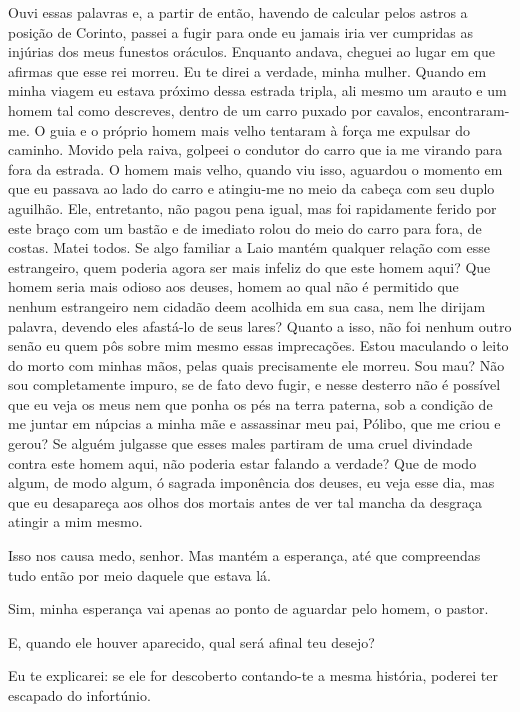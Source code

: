 Ouvi essas palavras e, a partir de então, havendo de calcular pelos
astros a posição de Corinto, passei a fugir para onde eu jamais iria ver
cumpridas as injúrias dos meus funestos oráculos. Enquanto andava,
cheguei ao lugar em que afirmas que esse rei morreu. Eu te direi a
verdade, minha mulher. Quando em minha viagem eu estava próximo dessa
estrada tripla, ali mesmo um arauto e um homem tal como descreves,
dentro de um carro puxado por cavalos, encontraram-me. O guia e o
próprio homem mais velho tentaram à força me expulsar do caminho. Movido
pela raiva, golpeei o condutor do carro que ia me virando para fora da
estrada. O homem mais velho, quando viu isso, aguardou o momento em que
eu passava ao lado do carro e atingiu-me no meio da cabeça com seu
duplo aguilhão. Ele, entretanto, não pagou pena igual, mas foi
rapidamente ferido por este braço com um bastão e de imediato rolou do
meio do carro para fora, de costas. Matei todos. Se algo familiar a Laio
mantém qualquer relação com esse estrangeiro, quem poderia agora ser
mais infeliz do que este homem aqui? Que homem seria mais odioso aos
deuses, homem ao qual não é permitido que nenhum estrangeiro nem cidadão
deem acolhida em sua casa, nem lhe dirijam palavra, devendo eles
afastá-lo de seus lares? Quanto a isso, não foi nenhum outro senão eu
quem pôs sobre mim mesmo essas imprecações. Estou maculando o
leito do morto com minhas mãos, pelas quais precisamente ele morreu. Sou
mau? Não sou completamente impuro, se de fato devo fugir, e nesse
desterro não é possível que eu veja os meus nem que ponha os pés na
terra paterna, sob a condição de me juntar em núpcias a minha mãe e
assassinar meu pai, Pólibo, que me criou e gerou? Se alguém julgasse que
esses males partiram de uma cruel divindade contra este homem aqui, não
poderia estar falando a verdade? Que de modo algum, de modo algum,
ó sagrada imponência dos deuses, eu veja esse dia, mas que eu desapareça
aos olhos dos mortais antes de ver tal mancha da desgraça atingir a mim
mesmo.

   Isso nos causa medo, senhor. Mas mantém a esperança, até que compreendas
tudo então por meio daquele que estava lá.

   Sim, minha esperança vai apenas ao ponto de aguardar pelo homem, o
pastor.

   E, quando ele houver aparecido, qual será afinal teu desejo?

    Eu te explicarei: se ele for descoberto contando-te a mesma
história, poderei ter escapado do infortúnio.

